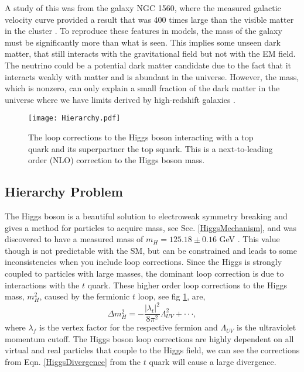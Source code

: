 A study of this was from the galaxy NGC 1560, where the measured galactic velocity curve provided a result that was 400 times large than the visible matter in the cluster \cite{broeils_mass_1992}.  To reproduce these features in models, the mass of the galaxy must be significantly more than what is seen. This implies some unseen dark matter, that still interacts with the gravitational field but not with the EM field. The neutrino could be a potential dark matter candidate due to the fact that it interacts weakly with matter and is abundant in the universe. However, the mass, which is nonzero, can only explain a small fraction of the dark matter in the universe where we have limits derived by high-redshift galaxies \cite{bertone_dark_2005}.

\begin{figure}
 	\centering
	\texttt{[image: Hierarchy.pdf]}
 	\caption[Hierarchy Problem Loop Correction]{The loop corrections to the Higgs boson interacting with a top quark and its superpartner the top squark. This is a next-to-leading order (NLO) correction to the Higgs boson mass.}
 	\label{HiggsMass} 
\end{figure}

\subsection{Hierarchy Problem} 
The Higgs boson is a beautiful solution to electroweak symmetry breaking and gives a method for particles to acquire mass, see Sec. \ref{HiggsMechanism},  and was discovered to have a measured mass of $m_{H}=125.18\pm0.16$ GeV \cite{chatrchyan_observation_2012}. This value though is not predictable with the SM, but can be constrained and leads to some inconsistencies when you include loop corrections. Since the Higgs is strongly coupled to particles with large masses, the dominant loop correction is due to interactions with the $t$ quark. These higher order loop corrections to the Higgs mass, $m_H^2$, caused by the fermionic $t$ loop, see fig \ref{HiggsMass}, are,
\begin{equation} \label{HiggsDivergence}
\Delta m_{H}^{2}=-\frac{|\lambda_{t}|^{2}}{8\pi^{2}}\Lambda_{UV}^{2}+\cdot\cdot\cdot,
\end{equation}
where $\lambda_f$ is the vertex factor for the respective fermion and $\Lambda_{UV}$ is the ultraviolet momentum cutoff. The Higgs boson loop corrections are highly dependent on all virtual and real particles that couple to the Higgs field, we can see the corrections from Eqn. \ref{HiggsDivergence} from the $t$ quark will cause a large divergence. 

